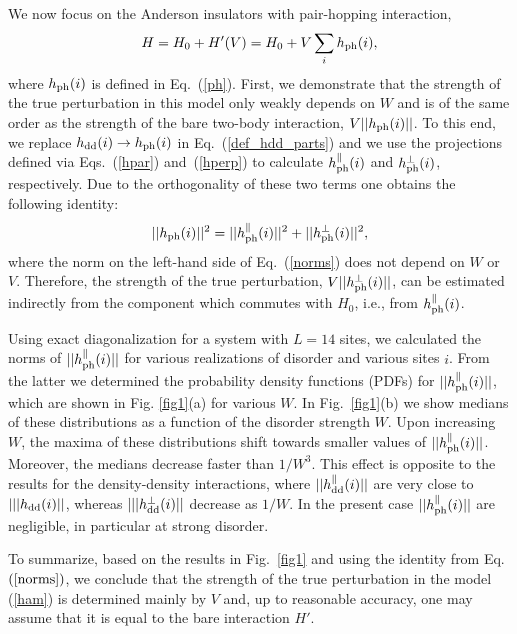 \documentclass[twocolumn,pre,superscriptaddress,10pt,aps,floatfix]{revtex4-1}
\begin{document}
We now focus on the Anderson insulators with pair-hopping interaction,
\begin{equation}
H=H_0 + H'(V) = H_0+V\sum_i h_{\rm ph}(i), \label{ham}
\end{equation}
where $h_{\rm ph}(i)$ is defined in Eq.~(\ref{ph}).
First, we demonstrate that the strength of the true perturbation in this model only weakly depends on $W$ and is of the same order as the strength of the bare two-body interaction, $V || h_{\rm ph}(i)||$. To this end, we replace $h_{\rm dd}(i) \to h_{\rm ph}(i)$ in Eq.~(\ref{def_hdd_parts}) and we use the projections defined via Eqs.~(\ref{hpar}) and~(\ref{hperp}) to calculate $ h^{\parallel}_{\rm ph}(i)$ and $ h^{\perp}_{\rm ph}(i)$, respectively. Due to the orthogonality of these two terms one obtains the following identity:
\begin{equation}
|| h_{\rm ph}(i)||^2=||h^{\parallel}_{\rm ph}(i)||^2+ || h^{\perp}_{\rm ph}(i)||^2, \label{norms}
\end{equation}
where the norm on the left-hand side of Eq.~(\ref{norms}) does not depend on $W$ or $V$. Therefore, the strength of the true perturbation, $V|| h^{\perp}_{\rm ph}(i)||$,  can be estimated indirectly from the component which commutes with $H_0$, i.e., from $h^{\parallel}_{\rm ph}(i)$. 

Using exact diagonalization for a system with $L=14$ sites, we calculated the norms of $||h^{\parallel}_{\rm ph}(i)||$ for various realizations of disorder and various sites $i$. From the latter we determined the probability density functions (PDFs) for $||h^{\parallel}_{\rm ph}(i)||$, which are shown in Fig. \ref{fig1}(a) for various $W$. 
In Fig.~\ref{fig1}(b) we show medians of these distributions as a function of the disorder strength $W$. Upon increasing $W$, the maxima of these
distributions shift towards smaller values of $||h^{\parallel}_{\rm ph}(i)||$. Moreover, the medians decrease faster than $1/W^3$.    
This effect is opposite to the results for the density-density interactions, where $||h^{\parallel}_{\rm dd}(i)||$ are very close to $|||h_{\rm dd}(i)||$, whereas
$|||h^{\perp}_{\rm dd}(i)||$ decrease as $1/W$. In the present case
$||h^{\parallel}_{\rm ph}(i)||$ are negligible, in particular at strong disorder. 

To summarize, based on the results in Fig.~\ref{fig1} and using the identity from Eq.~$(\ref{norms})$, we conclude that the strength of the true perturbation in the model (\ref{ham}) is determined mainly by $V$ and, up to reasonable accuracy, one may assume that it is equal to the bare interaction $H'$. 
\end{document}
